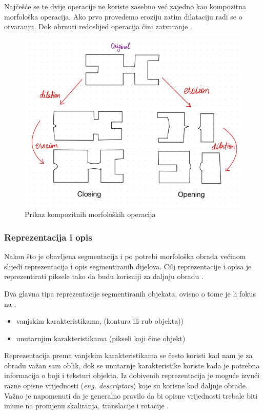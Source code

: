 \documentclass{foi}
\begin{document}
Najčešće se te dvije operacije ne koriste zasebno već zajedno kao kompozitna morfološka operacija. Ako prvo provedemo eroziju zatim dilataciju radi se o otvaranju. Dok obrnuti redoslijed operacija čini zatvaranje \cite{morph}.

\begin{figure}[H]
    \centering
    \includegraphics[width=0.6\linewidth]{slike/otvaranje_zatvaranje.png}
    \caption{Prikaz kompozitnih morfoloških operacija \cite{morph}}
\end{figure}

\subsubsection{Reprezentacija i opis}
Nakon što je obavljena segmentacija i po potrebi morfološka obrada većinom slijedi reprezentacija i opis segmentiranih dijelova. Cilj reprezentacije i opisa je reprezentirati piksele tako da budu korisniji za daljnju obradu \cite{RepAndDesc}. 

\begin{flushleft}
    Dva glavna tipa reprezentacije segmentiranih objekata, ovisno o tome je li fokus na \cite{RepAndDesc}:

\begin{itemize}
    \item vanjskim karakteristikama, (kontura ili rub objekta))
    \item unutarnjim karakteristikama (pikseli koji čine objekt)
\end{itemize}
\end{flushleft}

Reprezentacija prema vanjskim karakteristikama se često koristi kad nam je za obradu važan sam oblik, dok se unutarnje karakteristike koriste kada je potrebna informacija o boji i teksturi objekta. Iz dobivenih reprezentacija je moguće izvući razne opisne vrijednosti (\textit{eng. descriptors}) koje su korisne kod daljnje obrade. Važno je napomenuti da je generalno pravilo da bi opisne vrijednosti trebale biti imune na promjenu skaliranja, translacije i rotacije \cite{RepAndDesc}.
\end{document}

